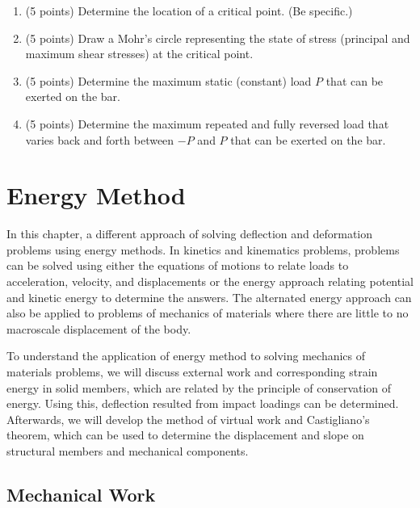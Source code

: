 \documentclass[
10pt,
a4paper,
openany,
svgnames,
]{book} %
\begin{document}
\begin{exercises}
  \begin{enumerate}
  \item (5 points) Determine the location of a critical point. (Be specific.)
  \item (5 points) Draw a Mohr's circle representing the state of stress (principal and maximum shear stresses) at the critical point.
  \item (5 points) Determine the maximum static (constant) load $P$ that can be exerted on the bar.
  \item (5 points) Determine the maximum repeated and fully reversed load that varies back and forth between $-P$ and $P$ that can be exerted on the bar.
  \end{enumerate}
\end{exercises}


\chapter{Energy Method}

In this chapter, a different approach of solving deflection and deformation problems using energy methods. In kinetics and kinematics problems, problems can be solved using either the equations of motions to relate loads to acceleration, velocity, and displacements or the energy approach relating potential and kinetic energy to determine the answers. The alternated energy approach can also be applied to problems of mechanics of materials where there are little to no macroscale displacement of the body.

To understand the application of energy method to solving mechanics of materials problems, we will discuss external work and corresponding strain energy in solid members, which are related by the principle of conservation of energy. Using this, deflection resulted from impact loadings can be determined. Afterwards, we will develop the method of virtual work and Castigliano's theorem, which can be used to determine the displacement and slope on structural members and mechanical components.

\section{Mechanical Work}
\end{document}
